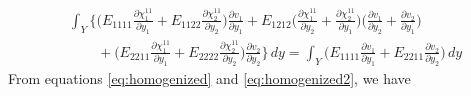 \documentclass[openright,twoside]{iitkthesis}
\begin{document}
\begin{equation}
\label{eq:homogenized2}
\begin{split}
&\int_Y \bigg \{\bigg ( E_{1111}\frac{\partial \chi^{11}_1}{\partial y_1} + E_{1122}\frac{\partial \chi^{11}_2}{\partial y_2}\bigg )\frac{\partial v_1}{\partial y_1} + E_{1212}\bigg (\frac{\partial \chi^{11}_1}{\partial y_2} + \frac{\partial \chi^{11}_2}{\partial y_1}\bigg )\bigg (\frac{\partial v_1}{\partial y_2} +\frac{\partial v_2}{\partial y_1}\bigg )\\
&\qquad + \bigg (E_{2211}\frac{\partial \chi^{11}_1}{\partial y_1} + E_{2222}\frac{\partial \chi^{11}_2}{\partial y_2}\bigg )\frac{\partial v_2}{\partial y_2}\bigg \}\,dy = \int_Y\bigg (E_{1111}\frac{\partial v_1}{\partial y_1}+E_{2211}\frac{\partial v_2}{\partial y_2}\bigg )\, dy
\end{split}
\end{equation}
From equations \eqref{eq:homogenized} and \eqref{eq:homogenized2}, we have
\end{document}

